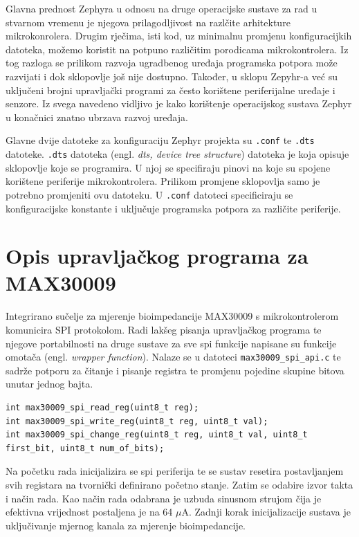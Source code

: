 \documentclass[../diplomski_rad.tex]{subfiles}
\begin{document}
Glavna prednost Zephyra u odnosu na druge operacijske sustave za rad u stvarnom vremenu je njegova prilagodljivost 
na razlčite arhitekture mikrokonrolera. 
Drugim rječima, isti kod, uz minimalnu promjenu konfiguracijkih datoteka, možemo koristit na potpuno 
različitim porodicama mikrokontrolera. Iz tog razloga se prilikom razvoja ugradbenog uređaja programska potpora može razvijati 
i dok sklopovlje još nije dostupno.
Također, u sklopu Zepyhr-a već su uključeni brojni upravljački programi za često korištene periferijalne 
uređaje i senzore. Iz svega navedeno vidljivo je kako korištenje operacijskog sustava Zephyr u konačnici 
znatno ubrzava razvoj uređaja.

Glavne dvije datoteke za konfiguraciju Zephyr projekta su \texttt{.conf} te \texttt{.dts} datoteke. 
\texttt{.dts} datoteka (engl. \textit{dts, device tree structure}) datoteka je koja opisuje sklopovlje koje se programira. 
U njoj se specifiraju pinovi na koje su spojene korištene periferije mikrokontrolera. 
Prilikom promjene sklopovlja samo je potrebno promjeniti ovu datoteku. U \texttt{.conf} datoteci specificiraju se 
konfiguracijske konstante i uključuje programska potpora za različite periferije.

\section{Opis upravljačkog programa za MAX30009}

Integrirano sučelje za mjerenje bioimpedancije MAX30009 s mikrokontrolerom komunicira SPI protokolom. 
Radi lakšeg pisanja upravljačkog programa te njegove portabilnosti na druge sustave za sve spi funkcije 
napisane su funkcije omotača (engl. \textit{wrapper function}). 
Nalaze se u datoteci \texttt{max30009\_spi\_api.c} te sadrže 
potporu za čitanje i pisanje registra te promjenu pojedine skupine bitova unutar jednog bajta. 

\begin{lstlisting}[label={lst:api_api},style=CStyle,caption={Funkcije omotača spi komunikacije},captionpos=b]
int max30009_spi_read_reg(uint8_t reg);
int max30009_spi_write_reg(uint8_t reg, uint8_t val);
int max30009_spi_change_reg(uint8_t reg, uint8_t val, uint8_t first_bit, uint8_t num_of_bits);
\end{lstlisting} 

Na početku rada inicijalizira se spi periferija te se sustav resetira postavljanjem svih registara na tvornički definirano početno stanje. 
Zatim se odabire izvor takta i način rada. Kao način rada odabrana je uzbuda sinusnom strujom 
čija je efektivna vrijednost postaljena je na 64  $\mu$A. 
Zadnji korak inicijalizacije sustava je uključivanje mjernog kanala za mjerenje bioimpedancije.
\end{document}
